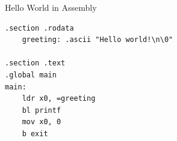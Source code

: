 \begin{frame}[fragile]{Hello World in Assembly}

\begin{verbatim}
.section .rodata
    greeting: .ascii "Hello world!\n\0"

.section .text
.global main
main:
    ldr x0, =greeting
    bl printf
    mov x0, 0
    b exit
\end{verbatim}

\end{frame}